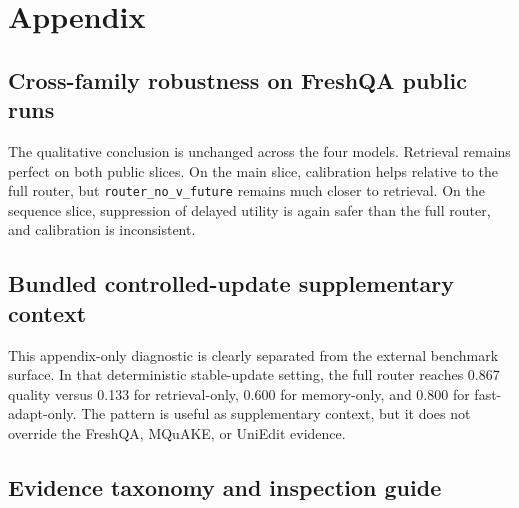 \section{Appendix}

\subsection{Cross-family robustness on FreshQA public runs}

\begin{table}[h]
\centering
\small

\caption{FreshQA cross-family robustness. The retrieval-dominant boundary survives the extension from the primary FLAN matrix to Qwen2.5-1.5B-Instruct and SmolLM2-360M-Instruct.}
\label{tab:appendix-public-cross-family}
\end{table}

The qualitative conclusion is unchanged across the four models. Retrieval remains perfect on both public slices. On the main slice, calibration helps relative to the full router, but \texttt{router\_no\_v\_future} remains much closer to retrieval. On the sequence slice, suppression of delayed utility is again safer than the full router, and calibration is inconsistent.

\subsection{Bundled controlled-update supplementary context}

\begin{table}[h]
\centering
\small

\caption{Appendix-only controlled-update diagnostic. This deterministic local benchmark is supplementary context rather than part of the external benchmark surface.}
\label{tab:appendix-freshness}
\end{table}

This appendix-only diagnostic is clearly separated from the external benchmark surface. In that deterministic stable-update setting, the full router reaches 0.867 quality versus 0.133 for retrieval-only, 0.600 for memory-only, and 0.800 for fast-adapt-only. The pattern is useful as supplementary context, but it does not override the FreshQA, MQuAKE, or UniEdit evidence.

\subsection{Evidence taxonomy and inspection guide}

